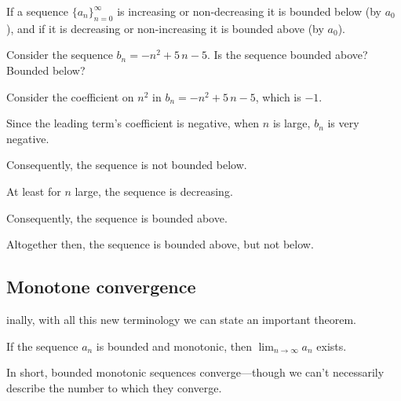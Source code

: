 \documentclass{ximera}
\begin{document}
If a sequence $
\{a_n\}_{n=0}^\infty$ is increasing or non-decreasing it is bounded
below (by $ a_0$), and if it is decreasing or non-increasing it is
bounded above (by $ a_0$).

\begin{question}
  Consider the sequence $b_{n} = -n^{2} + 5 \, n - 5$.  Is the sequence bounded above?  Bounded below?

    \begin{hint}
      Consider the coefficient on $n^{2}$ in $b_{n} = -n^{2} + 5 \, n - 5$, which is $-1$.
    \end{hint}
    \begin{hint}
      Since the leading term's coefficient is negative, when $n$ is large, $b_{n}$ is very negative.
    \end{hint}
    \begin{hint}
      Consequently, the sequence is not bounded below.
    \end{hint}
    \begin{hint}
      At least for $n$ large, the sequence is decreasing.
    \end{hint}
    \begin{hint}
      Consequently, the sequence is bounded above.
    \end{hint}
    \begin{hint}
      Altogether then, the sequence is bounded above, but not below.
    \end{hint}

    \begin{multipleChoice}
    \end{multipleChoice}

\end{question}


\subsection{Monotone convergence}

inally, with all this new terminology we can state an important
theorem.

\begin{theorem} If the sequence $a_n$ is bounded and monotonic, then
  $\lim_{n \to \infty} a_n$ exists.  \label{thm:bounded-monotonic}
\end{theorem}
In short, bounded monotonic sequences converge---though we can't
necessarily describe the number to which they converge.
\end{document}
